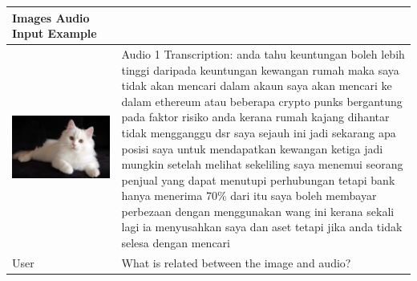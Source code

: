\documentclass[preprint]{article}
\begin{document}
\begin{table}[hbt!]
  \centering
  \setlength{\extrarowheight}{3pt}
  \renewcommand{\arraystretch}{1.5}
  \begin{tabular}{>{\arraybackslash}m{6.5cm}>{\arraybackslash}m{6.5cm}}
    \hline
    \textbf{Images Audio Input Example}                                                                                                                                                                                                                                                                                                                                                                                                                                                                                                                                                                                                                                                                                                       \\[6pt]
    \hline
    \hline
    \includegraphics[width=0.9\linewidth]{pic/cat.jpg} & Audio 1 Transcription:  anda tahu keuntungan boleh lebih tinggi daripada keuntungan kewangan rumah maka saya tidak akan mencari dalam akaun saya akan mencari ke dalam ethereum atau beberapa crypto punks bergantung pada faktor risiko anda kerana rumah kajang dihantar tidak mengganggu dsr saya sejauh ini jadi sekarang apa posisi saya untuk mendapatkan kewangan ketiga jadi mungkin setelah melihat sekeliling saya menemui seorang penjual yang dapat menutupi perhubungan tetapi bank hanya menerima 70\% dari itu saya boleh membayar perbezaan dengan menggunakan wang ini kerana sekali lagi ia menyusahkan saya dan aset tetapi jika anda tidak selesa dengan mencari \\
    \hline
    User                                               & What is related between the image and audio?                                                                                                                                                                                                                                                                                                                                                                                                                                                                                                                                                                                                                                         \\

\end{tabular}
\end{table}
\end{document}
